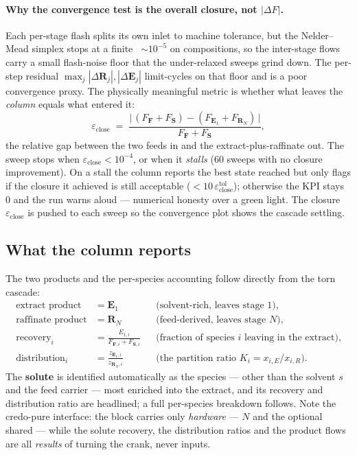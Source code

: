 \documentclass[11pt,a4paper]{article}
\begin{document}
\paragraph{Why the convergence test is the overall closure, not
$|\Delta F|$.} Each per-stage flash splits its own inlet to machine
tolerance, but the Nelder--Mead simplex stops at a finite
~$\sim 10^{-5}$ on compositions, so the inter-stage flows
carry a small flash-noise floor that the under-relaxed sweeps grind down.
The per-step residual $\max_j |\Delta \mathbf{R}_j|, |\Delta \mathbf{E}_j|$
limit-cycles on that floor and is a poor convergence proxy. The
physically meaningful metric is whether what leaves the \emph{column}
equals what entered it:
\begin{equation}
   \varepsilon_{\text{close}}
   \;=\;
   \frac{\bigl|\,(F_{\mathbf{F}} + F_{\mathbf{S}})
                - (F_{\mathbf{E}_1} + F_{\mathbf{R}_N})\,\bigr|}
        {F_{\mathbf{F}} + F_{\mathbf{S}}} ,
   \label{eq:extractor-closure}
\end{equation}
the relative gap between the two feeds in and the extract-plus-raffinate
out. The sweep stops when $\varepsilon_{\text{close}} < 10^{-4}$, or
when it \emph{stalls} (60 sweeps with no closure improvement). On a
stall the column reports the best state reached but only flags
 if the closure it achieved is still acceptable
($< 10\,\varepsilon_{\text{close}}^{\text{tol}}$); otherwise the
 KPI stays $0$ and the run warns aloud --- numerical
honesty over a green light. The closure $\varepsilon_{\text{close}}$ is
pushed to  each sweep so the convergence plot shows
the cascade settling.

\subsection{What the column reports}

The two products and the per-species accounting follow directly from the
torn cascade:
\begin{align}
   \text{extract product}   &= \mathbf{E}_1
        &&\text{(solvent-rich, leaves stage 1),} \\
   \text{raffinate product} &= \mathbf{R}_N
        &&\text{(feed-derived, leaves stage $N$),} \\
   \text{recovery}_i        &= \frac{E_{1,i}}{F_{\mathbf{F},i} + F_{\mathbf{S},i}}
        &&\text{(fraction of species $i$ leaving in the extract),} \\
   \text{distribution}_i    &= \frac{z_{\mathbf{E}_1,i}}{z_{\mathbf{R}_N,i}}
        &&\text{(the partition ratio $K_i = x_{i,E}/x_{i,R}$).}
\end{align}
The \textbf{solute} is identified automatically as the species --- other
than the solvent $s$ and the feed carrier --- most enriched into the
extract, and its recovery and distribution ratio are headlined; a full
per-species breakdown follows. Note the credo-pure interface: the
 block carries only \emph{hardware} --- 
$N$ and the optional shared  --- while the solute
recovery, the distribution ratios and the product flows are all
\emph{results} of turning the crank, never inputs.
\end{document}

